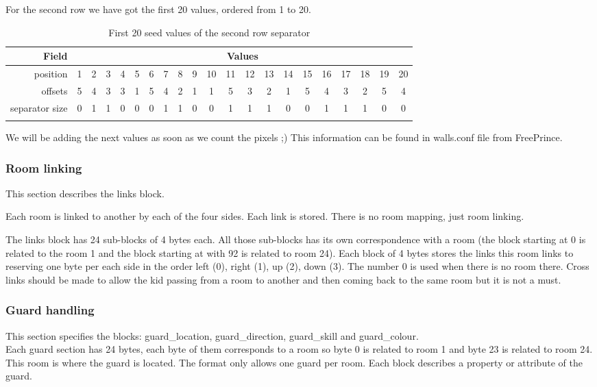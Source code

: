 \documentclass{article}
\begin{document}
 For the second row we have got the first 20 values, ordered from 1 to 20. \\ 
\renewcommand{\tabcolsep}{0.1em}
\begin{longtable}{r@{\hspace{1cm}}cccccccccccccccccccc}
  \hline
 Field      & \multicolumn{20}{c}{Values} \\
  \hline
 \endfirsthead
 position  &     1&2&3&4&5&6&7&8&9&10&11&12&13&14&15&16&17&18&19&20 \\
 offsets   &     5&4&3&3&1&5&4&2&1& 1& 5& 3& 2& 1& 5& 4& 3& 2& 5& 4 \\
 separator size& 0&1&1&0&0&0&1&1&0& 0& 1& 1& 1& 0& 0& 1& 1& 1& 0& 0 \\
\hline
\caption{First 20 seed values of the second row separator}
\label{seedss}
\end{longtable}

 We will be adding the next values as soon as we count the pixels ;)
 This information can be found in walls.conf file from FreePrince.

\subsubsection{Room linking \label{room linking}} %
 This section describes the links block.

 Each room is linked to another by each of the four sides. Each link
 is stored. There is no room mapping, just room linking.

 The links block has 24 sub-blocks of 4 bytes each. All those sub-blocks
 has its own correspondence with a room (the block starting at 0 is
 related to the room 1 and the block starting at with 92 is related to
 room 24).
 Each block of 4 bytes stores the links this room links to reserving one
 byte per each side in the order left (0), right (1), up (2), down (3).
 The number 0 is used when there is no room there.
 Cross links should be made to allow the kid passing from a room to
 another and then coming back to the same room but it is not a must.

\subsubsection{Guard handling\label{guard handling}} %
 This section specifies the blocks: guard\_location, guard\_direction,
 guard\_skill and guard\_colour.\\

 Each guard section has 24 bytes, each byte of them corresponds to a room
 so byte 0 is related to room 1 and byte 23 is related to room 24.
 This room is where the guard is located. The format only allows one
 guard per room. Each block describes a property or attribute of the guard.\\
\end{document}
